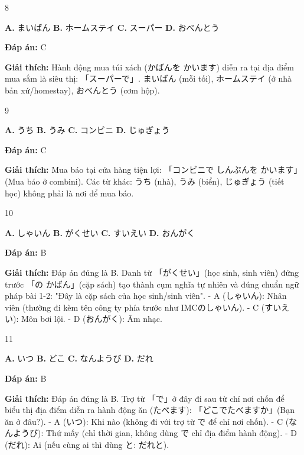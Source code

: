 \documentclass[12pt,a4paper]{report}
\newcommand{\source}[1]{}
\newcommand{\choice}[2]{\textbf{#1.} #2 \quad}
\newcommand{\answer}[1]{\par\textbf{Đáp án:} #1}
\newcommand{\confidence}[1]{}
\newcommand{\explain}[1]{\par\textbf{Giải thích:} #1\vspace{0.5cm}}
\begin{document}
\begin{question}{8}
\source{Q28_136_20251121082841.webp}
\choice{A}{まいばん}
\choice{B}{ホームステイ}
\choice{C}{スーパー}
\choice{D}{おべんとう}
\answer{C}
\confidence{high}
\explain{Hành động mua túi xách (かばんを かいます) diễn ra tại địa điểm mua sắm là siêu thị: 「スーパーで」. まいばん (mỗi tối), ホームステイ (ở nhà bản xứ/homestay), おべんとう (cơm hộp).}
\end{question}

\begin{question}{9}
\source{Q30_126_20251121082844.webp}
\choice{A}{うち}
\choice{B}{うみ}
\choice{C}{コンビニ}
\choice{D}{じゅぎょう}
\answer{C}
\confidence{high}
\explain{Mua báo tại cửa hàng tiện lợi: 「コンビニで しんぶんを かいます」 (Mua báo ở combini). Các từ khác: うち (nhà), うみ (biển), じゅぎょう (tiết học) không phải là nơi để mua báo.}
\end{question}

\begin{question}{10}
\source{4.webp}
\choice{A}{しゃいん}
\choice{B}{がくせい}
\choice{C}{すいえい}
\choice{D}{おんがく}
\answer{B}
\confidence{high}
\explain{Đáp án đúng là B. Danh từ 「がくせい」(học sinh, sinh viên) đứng trước 「の かばん」(cặp sách) tạo thành cụm nghĩa tự nhiên và đúng chuẩn ngữ pháp bài 1-2: "Đây là cặp sách của học sinh/sinh viên".
- A (しゃいん): Nhân viên (thường đi kèm tên công ty phía trước như IMCのしゃいん).
- C (すいえい): Môn bơi lội.
- D (おんがく): Âm nhạc.}
\end{question}

\begin{question}{11}
\source{8.webp}
\choice{A}{いつ}
\choice{B}{どこ}
\choice{C}{なんようび}
\choice{D}{だれ}
\answer{B}
\confidence{high}
\explain{Đáp án đúng là B. Trợ từ 「で」ở đây đi sau từ chỉ nơi chốn để biểu thị địa điểm diễn ra hành động ăn (たべます): 「どこでたべますか」(Bạn ăn ở đâu?).
- A (いつ): Khi nào (không đi với trợ từ で để chỉ nơi chốn).
- C (なんようび): Thứ mấy (chỉ thời gian, không dùng で chỉ địa điểm hành động).
- D (だれ): Ai (nếu cùng ai thì dùng と: だれと).}
\end{question}
\end{document}
